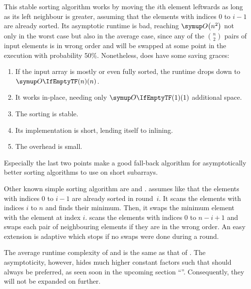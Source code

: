 \section{\texorpdfstring{\IS{}}{InsertionSort}}
\label{sec:tasklet:insertion}

This stable sorting algorithm works by moving the \(i\)th element leftwards as long as its left neighbour is greater, assuming that the elements with indices \(0\) to \(i - 1\) are already sorted.
Its asymptotic runtime is bad, reaching \(\bigoh*{n^2}\) not only in the worst case but also in the average case, since any of the \(\binom{n}{2}\) pairs of input elements is in wrong order and will be swapped at some point in the execution with probability 50\%.
Nonetheless, \IS{} does have some saving graces:
\begin{enumerate}
	\item
	If the input array is mostly or even fully sorted, the runtime drops down to \(\bigoh{n}\).

	\item
	It works in-place, needing only \(\bigoh{1}\) additional space.

	\item
	The sorting is stable.

	\item
	Its implementation is short, lending itself to inlining.

	\item
	The overhead is small.
\end{enumerate}
Especially the last two points make \IS{} a good fall-back algorithm for asymptotically better sorting algorithms to use on short subarrays.

\begin{note}
	Other known simple sorting algorithm are \SelS{} and \BS{}.
	\emph{\SelS{}} assumes like \IS{} that the elements with indices \(0\) to \(i - 1\) are already sorted in round~\(i\).
	It scans the elements with indices \(i\) to \(n\) and finds their minimum.
	Then, it swaps the minimum element with the element at index \(i\).
	\emph{\BS{}} scans the elements with indices \(0\) to \(n - i + 1\) and swaps each pair of neighbouring elements if they are in the wrong order.
	An easy extension is adaptive \BS{} which stops if no swaps were done during a round.

	The average runtime complexity of \SelS{} and \BS{} is the same as that of \IS{}.
	The asymptoticity, however, hides much higher constant factors such that \IS{} should always be preferred, as seen soon in the upcoming section \enquote{}.
	Consequently, they will not be expanded on further.
\end{note}


